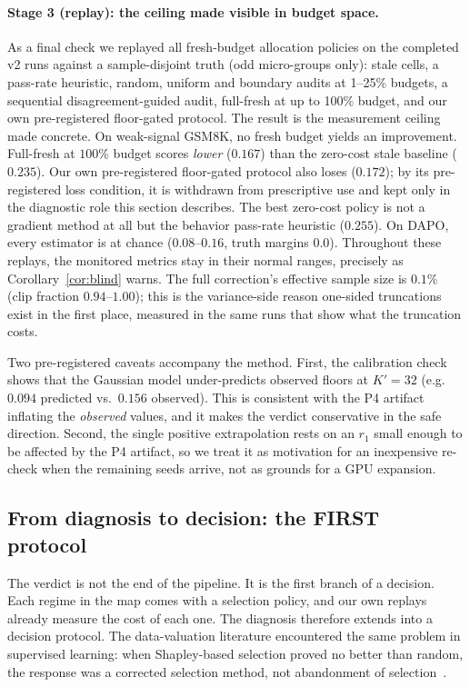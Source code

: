 \documentclass[11pt]{article}
\begin{document}
\paragraph{Stage 3 (replay): the ceiling made visible in budget space.} As a
final check we replayed all fresh-budget allocation policies on the completed
v2 runs against a sample-disjoint truth (odd micro-groups only): stale cells,
a pass-rate heuristic, random, uniform and boundary audits at 1--25\% budgets,
a sequential disagreement-guided audit, full-fresh at up to 100\% budget, and
our own pre-registered floor-gated protocol. The result is the measurement
ceiling made concrete. On weak-signal GSM8K, no fresh budget yields an improvement. Full-fresh at
$100\%$ budget scores \emph{lower} ($0.167$) than the zero-cost stale
baseline ($0.235$). Our own pre-registered floor-gated protocol also loses
($0.172$); by its pre-registered loss condition, it is withdrawn from
prescriptive use and kept only in the diagnostic role this section
describes. The best zero-cost policy is not a gradient method at all but the
behavior pass-rate heuristic ($0.255$). On DAPO, every estimator is at
chance ($0.08$--$0.16$, truth margins $0.0$). Throughout these replays, the
monitored metrics stay in their normal ranges, precisely as
Corollary~\ref{cor:blind} warns. The full correction's effective sample size
is $0.1\%$ (clip fraction $0.94$--$1.00$); this is the variance-side reason
one-sided truncations exist in the first place, measured in the same runs
that show what the truncation costs.

Two pre-registered caveats accompany the method. First, the calibration
check shows that the Gaussian model under-predicts observed floors at
$K'{=}32$ (e.g.\ $0.094$ predicted vs.\ $0.156$ observed). This is
consistent with the P4 artifact inflating the \emph{observed} values, and
it makes the verdict conservative in the safe direction. Second, the single
positive extrapolation rests on an $r_1$ small enough to be affected by the
P4 artifact, so we treat it as motivation for an inexpensive re-check when
the remaining seeds arrive, not as grounds for a GPU expansion.

\subsection{From diagnosis to decision: the FIRST protocol}
\label{sec:protocol}

The verdict is not the end of the pipeline. It is the first branch of a
decision. Each regime in the map comes with a selection policy, and our own
replays already measure the cost of each one. The diagnosis therefore
extends into a decision protocol.
The data-valuation literature encountered the same problem in supervised
learning: when Shapley-based selection proved no better than random, the
response was a corrected selection method, not abandonment of
selection~\citep{rethinkshapley,nash}.
\end{document}
